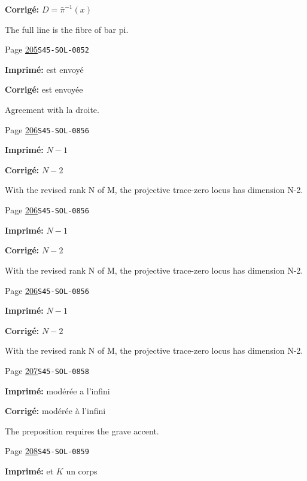 \begin{description}
\par\noindent\textbf{Corrigé:} $D=\bar\pi^{-1}(x)$
\par\noindent The full line is the fibre of bar pi.
\smallskip
\item[\hypertarget{apparatus:FR-0199}{199}] Page \hyperlink{printpage:fr:205}{205}\quad\texttt{S45-SOL-0852}
\par\noindent\textbf{Imprimé:} est envoyé
\par\noindent\textbf{Corrigé:} est envoyée
\par\noindent Agreement with la droite.
\smallskip
\item[\hypertarget{apparatus:FR-0200}{200}] Page \hyperlink{printpage:fr:206}{206}\quad\texttt{S45-SOL-0856}
\par\noindent\textbf{Imprimé:} \(N-1\)
\par\noindent\textbf{Corrigé:} \(N-2\)
\par\noindent With the revised rank N of M, the projective trace-zero locus has dimension N-2.
\smallskip
\item[\hypertarget{apparatus:FR-0201}{201}] Page \hyperlink{printpage:fr:206}{206}\quad\texttt{S45-SOL-0856}
\par\noindent\textbf{Imprimé:} \(N-1\)
\par\noindent\textbf{Corrigé:} \(N-2\)
\par\noindent With the revised rank N of M, the projective trace-zero locus has dimension N-2.
\smallskip
\item[\hypertarget{apparatus:FR-0202}{202}] Page \hyperlink{printpage:fr:206}{206}\quad\texttt{S45-SOL-0856}
\par\noindent\textbf{Imprimé:} \(N-1\)
\par\noindent\textbf{Corrigé:} \(N-2\)
\par\noindent With the revised rank N of M, the projective trace-zero locus has dimension N-2.
\smallskip
\item[\hypertarget{apparatus:FR-0203}{203}] Page \hyperlink{printpage:fr:207}{207}\quad\texttt{S45-SOL-0858}
\par\noindent\textbf{Imprimé:} modérée a l'infini
\par\noindent\textbf{Corrigé:} modérée à l'infini
\par\noindent The preposition requires the grave accent.
\smallskip
\item[\hypertarget{apparatus:FR-0204}{204}] Page \hyperlink{printpage:fr:208}{208}\quad\texttt{S45-SOL-0859}
\par\noindent\textbf{Imprimé:} et $K$ un corps

\end{description}
